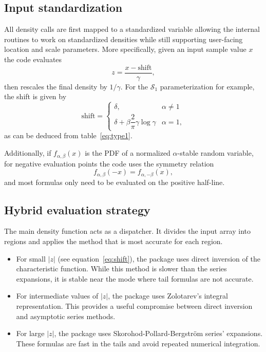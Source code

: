 \subsection{Input standardization}

All density calls are first mapped to a standardized variable allowing the internal routines to work on standardized densities while still supporting user-facing location and scale parameters. More specifically, given an input sample value $x$ the code evaluates
\begin{equation}
z=\frac{x-\text{shift}}{\gamma},
\label{eq:shift}
\end{equation}
then rescales the final density by $1/\gamma$. For the $\mathcal{S}_1$ parameterization for example, the shift is given by \cite[equation 1.5]{NolanJohnP2020USDM}
\[
\text{shift} =
\begin{cases}
\delta, & \alpha \neq 1\\
\delta + \beta \dfrac{2}{\pi} \gamma \log \gamma & \alpha = 1,
\end{cases}
\]
as can be deduced from table~\ref{eq:type1}.

Additionally, if $f_{\alpha,\beta}(x)$ is the PDF of a normalized $\alpha$-stable random variable, for negative evaluation points the code uses the symmetry relation \cite[proposition 1.1]{NolanJohnP2020USDM}
\[
f_{\alpha,\beta}(-x)=f_{\alpha,-\beta}(x),
\]
and most formulas only need to be evaluated on the positive half-line.

\subsection{Hybrid evaluation strategy}

The main density function acts as a dispatcher. It divides the input array into regions and applies the method that is most accurate for each region.
\begin{itemize}
\item For small $|z|$ (see equation~\eqref{eq:shift}), the package uses direct inversion of the characteristic function. While this method is slower than the series expansions, it is stable near the mode where tail formulas are not accurate.
\item For intermediate values of $|z|$, the package uses Zolotarev's integral representation. This provides a useful compromise between direct inversion and asymptotic series methods.
\item For large $|z|$, the package uses Skorohod-Pollard-Bergstr{\"o}m series' expansions. These formulas are fast in the tails and avoid repeated numerical integration.
\end{itemize}

